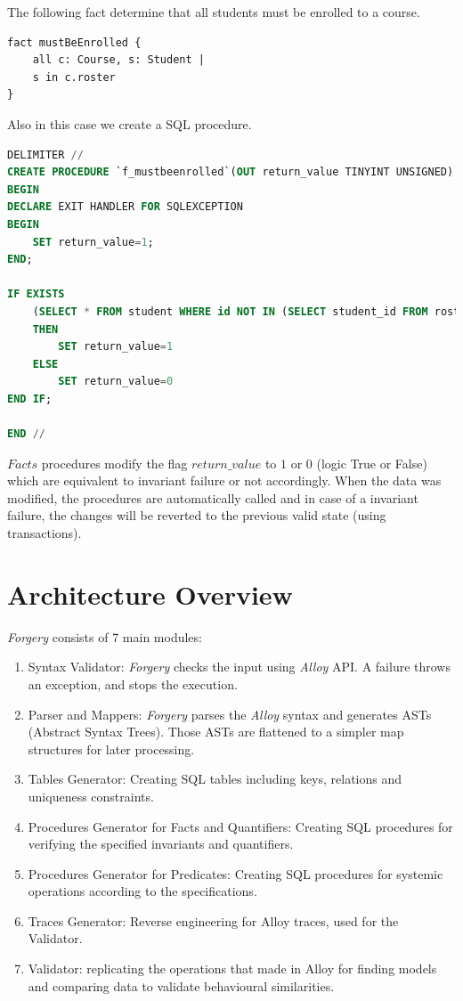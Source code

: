 \documentclass[oneside]{book}
\begin{document}
The following fact determine that all students must be enrolled to a course.
\begin{lstlisting}
fact mustBeEnrolled {
	all c: Course, s: Student | 
	s in c.roster
}
\end{lstlisting}

Also in this case we create a SQL procedure.

\begin{lstlisting}[escapechar=@,language=SQL]
DELIMITER //
CREATE PROCEDURE `f_mustbeenrolled`(OUT return_value TINYINT UNSIGNED)
BEGIN
DECLARE EXIT HANDLER FOR SQLEXCEPTION
BEGIN
	SET return_value=1;
END;

IF EXISTS
	(SELECT * FROM student WHERE id NOT IN (SELECT student_id FROM roster))
	THEN
		SET return_value=1
	ELSE
		SET return_value=0
END IF;
	
END //
\end{lstlisting}

$Facts$ procedures modify the flag $return\_value$ to $1$ or $0$ (logic True or False) which are equivalent to invariant failure or not accordingly. When the data was modified, the procedures are automatically called and in case of a invariant failure, the changes will be reverted to the previous valid state (using transactions).\\

\newpage

\section{Architecture Overview}

\textit{Forgery} consists of 7 main modules:
\begin{enumerate}
	\item Syntax Validator: \textit{Forgery} checks the input using \textit{Alloy} API. A failure throws an exception, and stops the execution.
	\item Parser and Mappers: \textit{Forgery} parses the \textit{Alloy} syntax and generates ASTs (Abstract Syntax Trees). Those ASTs are flattened to a simpler map structures for later processing.
	\item Tables Generator: Creating SQL tables including keys, relations and uniqueness constraints.
	\item Procedures Generator for Facts and Quantifiers: Creating SQL procedures for verifying the specified invariants and quantifiers. 
	\item Procedures Generator for Predicates: Creating SQL procedures for systemic operations according to the specifications.
	\item Traces Generator: Reverse engineering for Alloy traces, used for the Validator.
	\item Validator: replicating the operations that made in Alloy for finding models and comparing data to validate behavioural similarities.
\end{enumerate}
\end{document}
